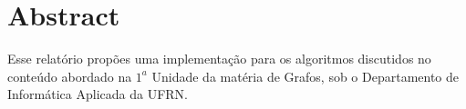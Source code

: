 \chapter*{\center \Large  Abstract}

Esse relatório propões uma implementação para os algoritmos
discutidos no conteúdo abordado na $1^a$ Unidade da matéria de
Grafos, sob o Departamento de Informática Aplicada da UFRN.
